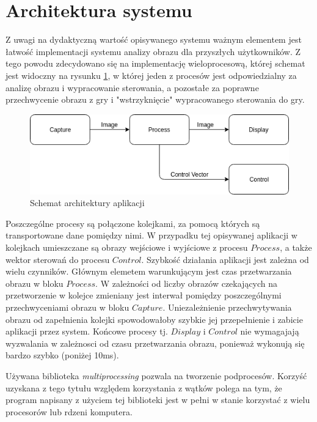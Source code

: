 \section{Architektura systemu}
Z uwagi na dydaktyczną wartość opisywanego systemu ważnym elementem jest łatwość implementacji systemu analizy obrazu dla przyszłych użytkowników. Z tego powodu zdecydowano się na implementację wieloprocesową, której schemat jest widoczny na rysunku \ref{fig:arch}, w której jeden z procesów jest odpowiedzialny za analizę obrazu i wypracowanie sterowania, a pozostałe za poprawne przechwycenie obrazu z gry i "wstrzyknięcie" wypracowanego sterowania do gry.

\begin{figure}
  \centering
  \includegraphics[width=13cm]{img/architektura.png}
  \caption{Schemat architektury aplikacji}
  \label{fig:arch}
\end{figure}

Poszczególne procesy są połączone kolejkami, za pomocą których są transportowane dane pomiędzy nimi. W przypadku tej opisywanej aplikacji w kolejkach umieszczane są obrazy wejściowe i wyjściowe z procesu $Process$, a także wektor sterowań do procesu $Control$. Szybkość działania aplikacji jest zależna od wielu czynników. Głównym elemetem warunkującym jest czas przetwarzania obrazu w bloku $Process$. W zależności od liczby obrazów czekających na przetworzenie w kolejce zmieniany jest interwał pomiędzy poszczególnymi przechwyceniami obrazu w bloku $Capture$. Uniezależnienie przechwytywania obrazu od zapełnienia kolejki spowodowałoby szybkie jej przepełnienie i zabicie aplikacji przez system. Końcowe procesy tj. $Display$ i $Control$ nie wymagajają wyzwalania w zależnosci od czasu przetwarzania obrazu, ponieważ wykonują się bardzo szybko (poniżej 10ms).

Używana biblioteka \textit{multiprocessing}\cite{S2} pozwala na tworzenie podprocesów. Korzyść uzyskana z tego tytułu względem korzystania z wątków polega na tym, że program napisany z użyciem tej biblioteki jest w pełni w stanie korzystać z wielu procesorów lub rdzeni komputera.

